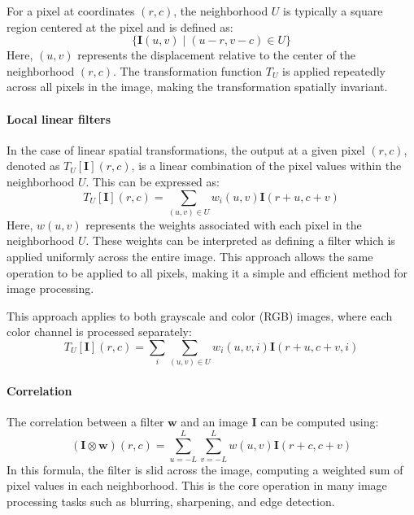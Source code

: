 For a pixel at coordinates $(r, c)$, the neighborhood $U$  is typically a square region centered at the pixel and is defined as:
\[\{\mathbf{I}(u,v)\mid(u-r,v-c)\in U\}\]
Here, $(u, v)$ represents the displacement relative to the center of the neighborhood $(r, c)$.
The transformation function $T_U$ is applied repeatedly across all pixels in the image, making the transformation spatially invariant.

\paragraph*{Local linear filters}
In the case of linear spatial transformations, the output at a given pixel $(r,c)$, denoted as $T_U[\mathbf{I}](r,c)$, is a linear combination of the pixel values within the neighborhood $U$. 
This can be expressed as:
\[T_U[\mathbf{I}](r,c)=\sum_{(u,v)\in U}w_i(u,v)\mathbf{I}(r+u,c+v)\]
Here, $w(u, v)$ represents the weights associated with each pixel in the neighborhood $U$.
These weights can be interpreted as defining a filter which is applied uniformly across the entire image. 
This approach allows the same operation to be applied to all pixels, making it a simple and efficient method for image processing.

This approach applies to both grayscale and color (RGB) images, where each color channel is processed separately:
\[T_U[\mathbf{I}](r,c)=\sum_i\sum_{(u,v)\in U}w_i(u,v,i)\mathbf{I}(r+u,c+v,i)\]

\paragraph*{Correlation}
The correlation between a filter $\mathbf{w}$ and an image $\mathbf{I}$ can be computed using:
\[(\mathbf{I}\otimes \mathbf{w})(r,c)=\sum_{u=-L}^L\sum_{v=-L}^Lw(u,v)\mathbf{I}(r+c,c+v)\]
In this formula, the filter is slid across the image, computing a weighted sum of pixel values in each neighborhood. 
This is the core operation in many image processing tasks such as blurring, sharpening, and edge detection.